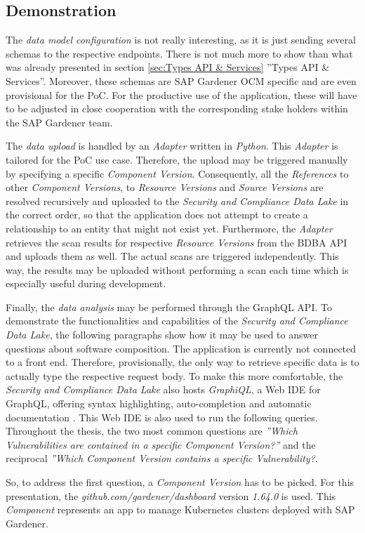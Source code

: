 \subsection{Demonstration}
The \emph{data model configuration} is not really interesting, as it is just sending several schemas to the respective endpoints. There is not much more to show than what was already presented in section \ref{sec:Types API & Services} ''Types API \& Services''. Moreover, these schemas are SAP Gardener OCM specific and are even provisional for the PoC. For the productive use of the application, these will have to be adjusted in close cooperation with the corresponding stake holders within the SAP Gardener team.\par
The \emph{data upload} is handled by an \emph{Adapter} written in \emph{Python}. This \emph{Adapter} is tailored for the PoC use case. Therefore, the upload may be triggered manually by specifying a specific \emph{Component Version}. Consequently, all the \emph{References} to other \emph{Component Versions}, to \emph{Resource Versions} and  \emph{Source Versions} are resolved recursively and uploaded to the \emph{Security and Compliance Data Lake} in the correct order, so that the application does not attempt to create a relationship to an entity that might not exist yet. Furthermore, the \emph{Adapter} retrieves the scan results for respective \emph{Resource Versions} from the BDBA API and uploads them as well. The actual scans are triggered independently. This way, the results may be uploaded without performing a scan each time which is especially useful during development.\par
Finally, the \emph{data analysis} may be performed through the GraphQL API. To demonstrate the functionalities and capabilities of the \emph{Security and Compliance Data Lake}, the following paragraphs show how it may be used to answer questions about software composition. The application is currently not connected to a front end. Therefore, provisionally, the only way to retrieve specific data is to actually type the respective request body. To make this more comfortable, the \emph{Security and Compliance Data Lake} also hosts \emph{GraphiQL}, a Web IDE for GraphQL, offering syntax highlighting, auto-completion and automatic documentation \cite{graphiql}. This Web IDE is also used to run the following queries.\\

Throughout the thesis, the two most common questions are \emph{''Which Vulnerabilities are contained in a specific Component Version?''} and the reciprocal \emph{''Which Component Version contains a specific Vulnerability?}.\par
So, to address the first question, a \emph{Component Version} has to be picked. For this presentation, the \emph{github.com/gardener/dashboard} version \emph{1.64.0} is used. This \emph{Component} represents an app to manage Kubernetes clusters deployed with SAP Gardener.

